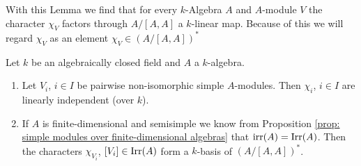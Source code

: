 With this Lemma we find that for every $k$-Algebra $A$ and $A$-module $V$ the character $\chi_V$ factors through $A/[A,A]$ a $k$-linear map.
Because of this we will regard $\chi_V$ as an element $\chi_V \in (A/[A,A])^*$


\begin{thrm} \label{thrm: characters as a basis}
  Let $k$ be an algebraically closed field and $A$ a $k$-algebra.
  \begin{enumerate}[label=\emph{\alph*)},leftmargin=*]
    \item
      Let $V_i$, $i \in I$ be pairwise non-isomorphic simple $A$-modules.
      Then $\chi_i$, $i \in I$ are linearly independent (over $k$).
    \item
      If $A$ is finite-dimensional and semisimple we know from Proposition \ref{prop: simple modules over finite-dimensional algebras} that $\operatorname{irr}(A) = \operatorname{Irr}(A)$.
      Then the characters $\chi_{V_i}$, $[V_i] \in \operatorname{Irr}(A)$ form a $k$-basis of $(A/[A,A])^*$.
  \end{enumerate}
\end{thrm}
